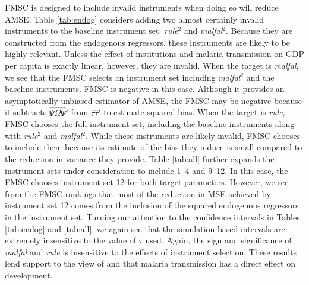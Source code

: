\documentclass[12pt]{article}
\theoremstyle{definition}
\begin{document}
FMSC is designed to include invalid instruments when doing so will reduce AMSE. Table \ref{tab:endog} considers adding two almost certainly invalid instruments to the baseline instrument set: \emph{rule}$^2$ and \emph{malfal}$^2$. Because they are constructed from the endogenous regressors, these instruments are likely to be highly relevant. Unless the effect of institutions and malaria transmission on GDP per capita is exactly linear, however, they are invalid. When the target is \emph{malfal}, we see that the FMSC selects an instrument set including \emph{malfal}$^2$ and the baseline instruments. FMSC is negative in this case. Although it provides an asymptotically unbiased estimator of AMSE, the FMSC may be negative because it subtracts $\widehat{\Psi}\widehat{\Omega}\widehat{\Psi}'$ from $\widehat{\tau}\widehat{\tau}'$ to estimate squared bias. When the target is \emph{rule}, FMSC chooses the full instrument set, including the baseline instruments along with \emph{rule}$^2$ and \emph{malfal}$^2$. While these instruments are likely invalid, FMSC chooses to include them because its estimate of the bias they induce is small compared to the reduction in variance they provide. Table \ref{tab:all} further expands the instrument sets under consideration to include 1--4 and 9--12. In this case, the FMSC chooses instrument set 12 for both target parameters. However, we see from the FMSC rankings that most of the reduction in MSE achieved by instrument set 12 comes from the inclusion of the squared endogenous regressors in the instrument set. Turning our attention to the confidence intervals in Tables \ref{tab:endog} and \ref{tab:all}, we again see that the simulation-based intervals are extremely insensitive to the value of $\tau$ used. Again, the sign and significance of \emph{malfal} and \emph{rule} is insensitive to the effects of instrument selection. These results lend support to the view of \cite{Carstensen2006} and \cite{Sachs} that malaria transmission has a direct effect on development.
\end{document}
